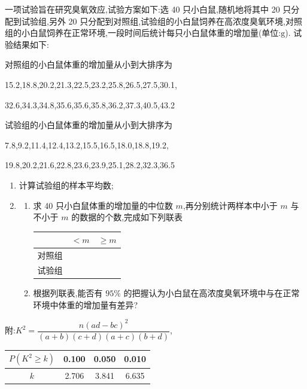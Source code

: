 \begin{problem}
一项试验旨在研究臭氧效应,试验方案如下:选 40 只小白鼠,随机地将其中 20 只分配到试验组,另外 20 只分配到对照组,试验组的小白鼠饲养在高浓度臭氧环境,对照组的小白鼠饲养在正常环境,一段时间后统计每只小白鼠体重的增加量(单位:\(\mathrm{g}\)). 试验结果如下:

对照组的小白鼠体重的增加量从小到大排序为

15.2,18.8,20.2,21.3,22.5,23.2,25.8,26.5,27.5,30.1,

32.6,34.3,34.8,35.6,35.6,35.8,36.2,37.3,40.5,43.2

试验组的小白鼠体重的增加量从小到大排序为

7.8,9.2,11.4,12.4,13.2,15.5,16.5,18.0,18.8,19.2,

19.8,20.2,21.6,22.8,23.6,23.9,25.1,28.2,32.3,36.5
\begin{enumerate}
\item 计算试验组的样本平均数;
\item
\begin{enumerate}
\item 求 40 只小白鼠体重的增加量的中位数 \(m\),再分别统计两样本中小于 \(m\) 与不小于 \(m\) 的数据的个数,完成如下列联表
\begin{center}
\begin{tabular}{|c|c|c|}
\hline
& \(<m\) & \(\ge m\) \\
\hline
对照组 &  &  \\
\hline
试验组 &  &  \\
\hline
\end{tabular}
\end{center}
\item 根据列联表,能否有 \(95\%\) 的把握认为小白鼠在高浓度臭氧环境中与在正常环境中体重的增加量有差异?
\end{enumerate}
\end{enumerate}

附:\(K^2=\dfrac{n\left(ad-bc\right)^2}{\left(a+b\right)\left(c+d\right)\left(a+c\right)\left(b+d\right)}\),

\begin{center}
\begin{tabular}{c|ccc}
\hline
\(P\left(K^2\ge k\right)\) & 0.100 & 0.050 & 0.010 \\
\hline
\(k\) & 2.706 & 3.841 & 6.635 \\
\hline
\end{tabular}
\end{center}
\end{problem}

